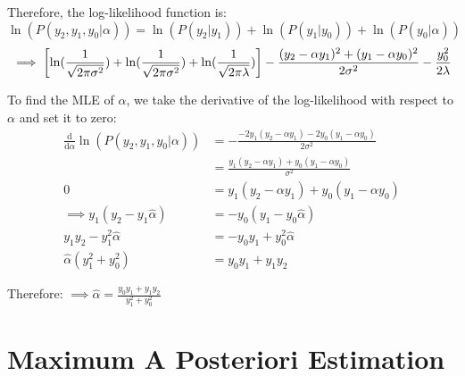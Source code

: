 \documentclass[a4paper, 10pt]{article}
\begin{document}
\begin{tosubmit}
Therefore, the log-likelihood function is:
\[
    \ln(P(y_2, y_1, y_0| \alpha)) = \ln(P(y_2|y_1)) + \ln(P(y_1|y_0)) + \ln(P(y_0| \alpha))
\]
\[
    \implies \left[ \ln(\frac{1}{\sqrt{2\pi\sigma^2}}) + \ln(\frac{1}{\sqrt{2\pi\sigma^2}}) + \ln(\frac{1}{\sqrt{2\pi\lambda}}) \right] - \frac{(y_2-\alpha y_1)^2 + (y_1-\alpha y_0)^2}{2\sigma^2} - \frac{y_0^2}{2\lambda}
\]

To find the MLE of \( \alpha \), we take the derivative of the log-likelihood with respect to \( \alpha \) and set it to zero:
\begin{align*}
    \frac{\text{d}}{\text{d}\alpha}\ln(P(y_2, y_1, y_0| \alpha)) &= - \frac{-2y_1(y_2-\alpha y_1) -2y_0(y_1-\alpha y_0)}{2\sigma^2} \\
    &=  \frac{y_1(y_2-\alpha y_1) + y_0(y_1-\alpha y_0)}{\sigma^2} \\
    0 &= y_1(y_2-\alpha y_1) + y_0(y_1-\alpha y_0) \\
    \implies y_1(y_2-y_1\hat{\alpha}) &= -y_0(y_1-y_0\hat{\alpha}) \\
    y_1y_2 - y_1^2\hat{\alpha} &= -y_0y_1+y_0^2\hat{\alpha} \\
    \hat{\alpha}(y_1^2 + y_0^2) &= y_0y_1 + y_1y_2
\end{align*}

Therefore: \( \boxed{\implies \hat{\alpha} = \frac{y_0y_1 + y_1y_2}{y_1^2 + y_0^2}} \)
\end{tosubmit}

\newpage

\section{Maximum A Posteriori Estimation}
\end{document}
